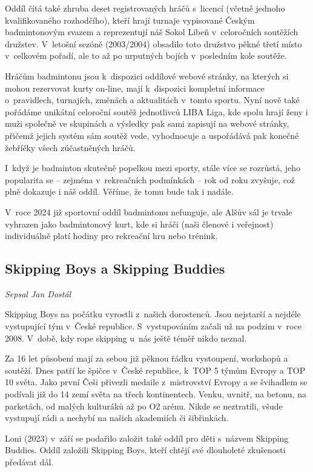 \documentclass[a5paper, 12pt, twoside]{article}
\begin{document}
Oddíl čítá také zhruba deset registrovaných hráčů s~licencí (včetně
jednoho kvalifikovaného rozhodčího), kteří hrají turnaje vypisované
Českým badmintonovým svazem a reprezentují náš Sokol Libeň v~celoročních
soutěžích družstev. V~letošní sezóně (2003/2004) obsadilo toto družstvo
pěkné třetí místo v~celkovém pořadí, ale to až po urputných bojích
v~posledním kole soutěže.

Hráčům badmintonu jsou k~dispozici oddílové webové stránky, na kterých
si mohou rezervovat kurty on-line, mají k~dispozici kompletní informace
o~pravidlech, turnajích, změnách a aktualitách v~tomto sportu. Nyní nově
také pořádáme unikátní celoroční soutěž jednotlivců LIBA Liga, kde spolu
hrají ženy i muži společně ve skupinách a výsledky pak sami zapisují na
webové stránky, přičemž jejich systém sám soutěž vede, vyhodnocuje a
uspořádává pak konečné žebříčky všech zúčastněných hráčů.

I~když je badminton skutečně popelkou mezi sporty, stále více se
rozrůstá, jeho popularita se -- zejména v~rekreačních podmínkách -- rok
od roku zvyšuje, což plně dokazuje i náš oddíl. Věříme, že tomu bude tak
i nadále.

V~roce 2024 již sportovní oddíl badmintonu nefunguje, ale Alšův sál je
trvale vyhrazen jako badmintonový kurt, kde si hráči (naši členové i
veřejnost) individuálně platí hodiny pro rekreační hru nebo trénink.

\subsection{Skipping Boys a Skipping
Buddies}

\textit{Sepsal Jan Dostál}

Skipping Boys na počátku vyrostli z~našich dorostenců. Jsou nejstarší a
nejdéle vystupující tým v~České republice. S~vystupováním začali už na
podzim v~roce 2008. V~době, kdy rope skipping u~nás ještě téměř nikdo
neznal.

Za 16 let působení mají za sebou již pěknou řádku vystoupení, workshopů
a soutěží. Dnes patří ke špičce v~České republice, k~TOP 5 týmům Evropy
a TOP 10 světa. Jako první Češi přivezli medaile z~mistrovství Evropy a
se švihadlem se podívali již do 14 zemí světa na třech kontinentech.
Venku, uvnitř, na betonu, na parketách, od malých kulturáků až po O2
arénu. Nikde se neztratili, všude vystupují rádi a nechybí na našich
akademiích či šibřinkách.

Loni (2023) v~září se podařilo založit také oddíl pro děti s~názvem
Skipping Buddies. Oddíl založili Skipping Boys, kteří chtějí své
dlouholeté zkušenosti předávat dál.
\end{document}
